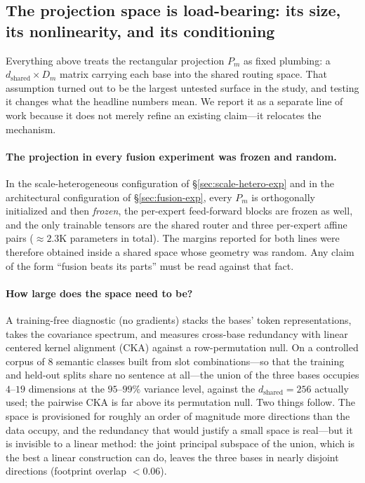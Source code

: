 \subsection{The projection space is load-bearing: its size, its nonlinearity, and its conditioning}
\label{sec:projection-space}

Everything above treats the rectangular projection $P_m$ as fixed plumbing: a
$d_{\text{shared}}\times D_m$ matrix carrying each base into the shared routing space. That
assumption turned out to be the largest untested surface in the study, and testing it changes what
the headline numbers mean. We report it as a separate line of work because it does not merely
refine an existing claim---it relocates the mechanism.

\paragraph{The projection in every fusion experiment was frozen and random.}
In the scale-heterogeneous configuration of \S\ref{sec:scale-hetero-exp} and in the
architectural configuration of \S\ref{sec:fusion-exp}, every $P_m$ is orthogonally initialized and
then \emph{frozen}, the per-expert feed-forward blocks are frozen as well, and the only trainable
tensors are the shared router and three per-expert affine pairs ($\approx 2.3$K parameters in
total). The margins reported for both lines were therefore obtained inside a shared space whose
geometry was random. Any claim of the form ``fusion beats its parts'' must be read against that
fact.

\paragraph{How large does the space need to be?}
A training-free diagnostic (no gradients) stacks the bases' token representations, takes the
covariance spectrum, and measures cross-base redundancy with linear centered kernel alignment
(CKA) against a row-permutation null. On a controlled corpus of $8$ semantic classes built from
slot combinations---so that the training and held-out splits share no sentence at all---the union of
the three bases occupies $4$--$19$ dimensions at the $95$--$99\%$ variance level, against the
$d_{\text{shared}}{=}256$ actually used; the pairwise CKA is far above its permutation null. Two
things follow. The space is provisioned for roughly an order of magnitude more directions than the
data occupy, and the redundancy that would justify a small space is real---but it is invisible to
a linear method: the joint principal subspace of the union, which is the best a linear
construction can do, leaves the three bases in nearly disjoint directions (footprint overlap
$<0.06$).

